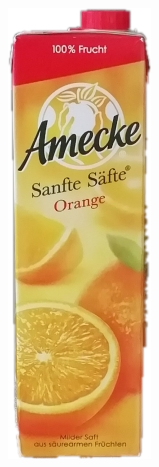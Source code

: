 \begin{appendices}
\begin{figure}[htb]
\begin{minipage}[c]{0.2\textwidth}
\end{minipage}
\hfill
\begin{minipage}[c]{0.08\textwidth}
\includegraphics[width=\textwidth]{Sources/Bild3_GW.png}

\end{minipage}
\end{figure}
\end{appendices}

